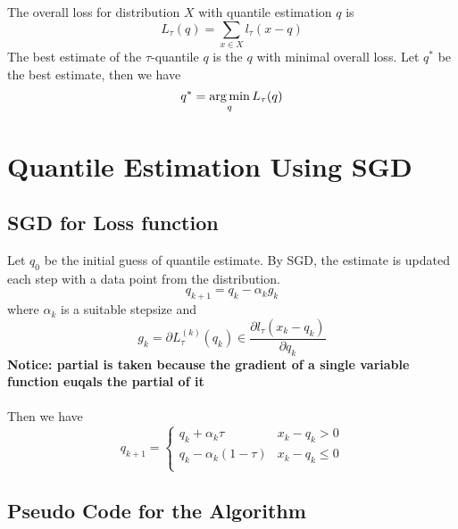 \documentclass[11pt]{article}
\begin{document}
The overall loss for distribution $X$ with quantile estimation $q$ is
$$
L_{\tau}(q) = \sum_{x \in X} l_{\tau}(x - q)
$$
The best estimate of the $\tau$-quantile $q$ is the $q$ with minimal overall loss. 
Let $q^\ast$ be the best estimate, then we have
$$
q^\ast = \operatorname*{arg\,min}_{q} L_{\tau}(q)
$$


\section{Quantile Estimation Using SGD}

\subsection{SGD for Loss function}

Let $q_0$ be the initial guess of quantile estimate. 
By SGD, the estimate is updated each step with a data point from the distribution.
$$
q_{k+1} = q_k - \alpha_k g_k
$$
where $ \alpha_k $ is a suitable stepsize and 
$$
g_k = \partial L_{\tau}^{(k)}(q_k) \in \frac{\partial l_\tau(x_k - q_k)}{\partial q_k}
$$ 
\textbf{Notice: partial is taken because the gradient of a single variable function
euqals the partial of it}
\\\\
Then we have
$$
q_{k+1} = 
    \begin{cases}
        q_k + \alpha_k \tau               & x_k - q_k > 0\\
        q_k - \alpha_k (1-\tau)           & x_k - q_k \leq 0\\
    \end{cases}
$$

\subsection{Pseudo Code for the Algorithm}



    
\end{document}
